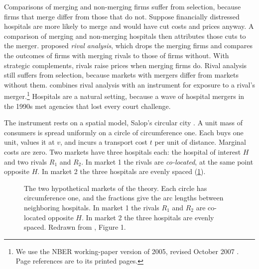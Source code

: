  Comparisons of merging and non-merging firms suffer from selection, because firms that merge
differ from those that do not. Suppose financially distressed hospitals are more likely to merge and would have
cut costs and prices anyway. A comparison of merging and non-merging hospitals then attributes those cuts to the
merger. \citet{Eckbo1983} proposed \emph{rival analysis}, which drops the merging firms and compares the outcomes of
firms with merging rivals to those of firms without. With strategic complements, rivals raise prices when merging
firms do. Rival analysis still suffers from selection, because markets with mergers differ from markets without
them. \citet{Dafny2009} combines rival analysis with an instrument for exposure to a rival's
merger.\footnote{We use the NBER working-paper version of 2005, revised October 2007 \citep{Dafny2005}. Page
references are to its printed pages.} Hospitals are a natural setting, because a wave of hospital mergers in the
1990s met agencies that lost every court challenge.

 The instrument rests on a spatial model, Salop's circular city \citep{Salop1979}. A unit mass of
consumers is spread uniformly on a circle of circumference one. Each buys one unit, values it at $v$, and incurs a
transport cost $t$ per unit of distance. Marginal costs are zero. Two markets have three hospitals each: the
hospital of interest $H$ and two rivals $R_1$ and $R_2$. In market 1 the rivals are \emph{co-located}, at the same
point opposite $H$. In market 2 the three hospitals are evenly spaced (\cref{fig:11-dafny}).

\begin{figure}[htbp]
\centering
{}
\caption{The two hypothetical markets of the theory. Each circle has circumference one, and the fractions give the
arc lengths between neighboring hospitals. In market 1 the rivals $R_1$ and $R_2$ are co-located opposite $H$. In
market 2 the three hospitals are evenly spaced. Redrawn from \citet{Dafny2005}, Figure 1.}
\label{fig:11-dafny}
\end{figure}

